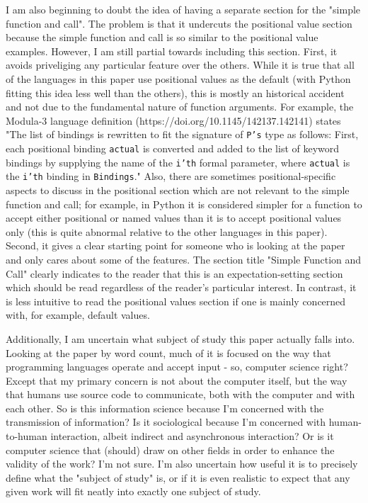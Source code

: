 I am also beginning to doubt the idea of having a separate section for the "simple
function and call".
The problem is that it undercuts the positional value section because the simple function
and call is so similar to the positional value examples.
However, I am still partial towards including this section.
First, it avoids priveliging any particular feature over the others.
While it is true that all of the languages in this paper use positional values as the
default (with Python fitting this idea less well than the others),
this is mostly an historical accident and not due to the fundamental nature of function
arguments.
For example, the Modula-3 language definition (https://doi.org/10.1145/142137.142141)
states "The list of bindings is rewritten to fit the signature of \texttt{P's} type as
follows: First, each positional binding \texttt{actual} is converted and added to the list
of keyword bindings by supplying the name of the \texttt{i'th} formal parameter, where
\texttt{actual} is the \texttt{i'th} binding in \texttt{Bindings}."
Also, there are sometimes positional-specific aspects to discuss in the positional section
which are not relevant to the simple function and call; for example, in Python it is
considered simpler for a function to accept either positional or named values than it is
to accept positional values only (this is quite abnormal relative to the other languages
in this paper).
Second, it gives a clear starting point for someone who is looking at the paper and only
cares about some of the features.
The section title "Simple Function and Call" clearly indicates to the reader that this is
an expectation-setting section which should be read regardless of the reader's particular
interest.
In contrast, it is less intuitive to read the positional values section if one is mainly
concerned with, for example, default values.

Additionally, I am uncertain what subject of study this paper actually falls into.
Looking at the paper by word count, much of it is focused on the way that programming
languages operate and accept input - so, computer science right?
Except that my primary concern is not about the computer itself, but the way that humans
use source code to communicate, both with the computer and with each other.
So is this information science because I'm concerned with the transmission of information?
Is it sociological because I'm concerned with human-to-human interaction, albeit indirect
and asynchronous interaction?
Or is it computer science that (should) draw on other fields in order to enhance the
validity of the work?
I'm not sure.
I'm also uncertain how useful it is to precisely define what the "subject of study" is, or
if it is even realistic to expect that any given work will fit neatly into exactly one
subject of study.

